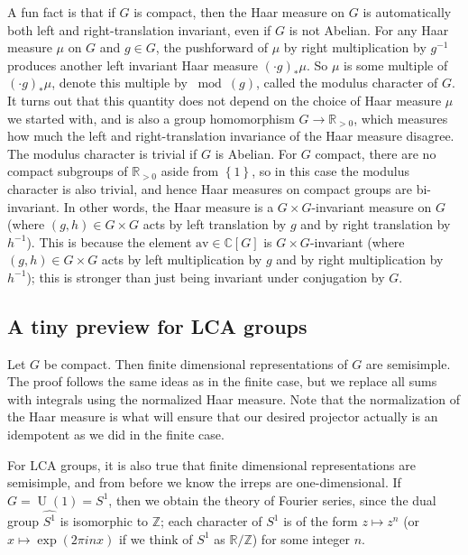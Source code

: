 \documentclass[11pt,leqno]{article}
\theoremstyle{plain}
\theoremstyle{definition}
\numberwithin{equation}{section}
\numberwithin{lem}{section}
\newcommand{\cbr}[1]{\left\{#1\right\}}
\DeclareMathOperator{\U}{U}
\newcommand{\av}{\mathrm{av}}
\begin{document}
A fun fact is that if $G$ is compact, then the Haar measure on $G$ is automatically both left and right-translation invariant, even if $G$ is not Abelian. For any Haar measure $\mu$ on $G$ and $g\in G$, the pushforward of $\mu$ by right multiplication by $g^{-1}$ produces another left invariant Haar measure $(\cdot g)_\ast\mu$. So $\mu$ is some multiple of $(\cdot g)_\ast\mu$, denote this multiple by $\bmod(g)$, called the modulus character of $G$. It turns out that this quantity does not depend on the choice of Haar measure $\mu$ we started with, and is also a group homomorphism $G\to \mathbb R_{>0}$, which measures how much the left and right-translation invariance of the Haar measure disagree. The modulus character is trivial if $G$ is Abelian. For $G$ compact, there are no compact subgroups of $\mathbb R_{>0}$ aside from $\cbr{1}$, so in this case the modulus character is also trivial, and hence Haar measures on compact groups are bi-invariant. In other words, the Haar measure is a $G\times G$-invariant measure on $G$ (where $(g,h)\in G\times G$ acts by left translation by $g$ and by right translation by $h^{-1}$). This is because the element $\av\in\mathbb C[G]$ is $G\times G$-invariant (where $(g,h)\in G\times G$ acts by left multiplication by $g$ and by right multiplication by $h^{-1}$); this is stronger than just being invariant under conjugation by $G$.

\subsection{A tiny preview for LCA groups}
Let $G$ be compact. Then finite dimensional representations of $G$ are semisimple. The proof follows the same ideas as in the finite case, but we replace all sums with integrals using the normalized Haar measure. Note that the normalization of the Haar measure is what will ensure that our desired projector actually is an idempotent as we did in the finite case.

For LCA groups, it is also true that finite dimensional representations are semisimple, and from before we know the irreps are one-dimensional. If $G = \U(1) = S^1$, then we obtain the theory of Fourier series, since the dual group $\widehat{S^1}$ is isomorphic to $\mathbb Z$; each character of $S^1$ is of the form $z\mapsto z^n$ (or $x\mapsto \exp(2\pi i nx)$ if we think of $S^1$ as $\mathbb R/\mathbb Z$) for some integer $n$.

\end{document}
